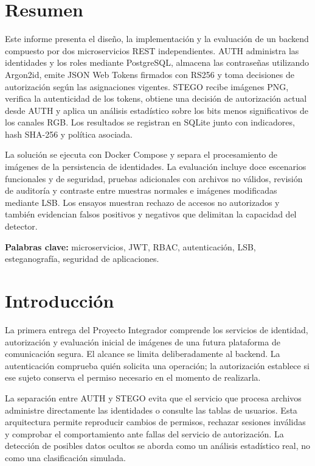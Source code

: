 \documentclass[11pt,a4paper,oneside]{article}
\begin{document}
\section*{Resumen}
Este informe presenta el diseño, la implementación y la evaluación de un backend compuesto por dos microservicios REST independientes. AUTH administra las identidades y los roles mediante PostgreSQL, almacena las contraseñas utilizando Argon2id, emite JSON Web Tokens firmados con RS256 y toma decisiones de autorización según las asignaciones vigentes. STEGO recibe imágenes PNG, verifica la autenticidad de los tokens, obtiene una decisión de autorización actual desde AUTH y aplica un análisis estadístico sobre los bits menos significativos de los canales RGB. Los resultados se registran en SQLite junto con indicadores, hash SHA-256 y política asociada.

La solución se ejecuta con Docker Compose y separa el procesamiento de imágenes de la persistencia de identidades. La evaluación incluye doce escenarios funcionales y de seguridad, pruebas adicionales con archivos no válidos, revisión de auditoría y contraste entre muestras normales e imágenes modificadas mediante LSB. Los ensayos muestran rechazo de accesos no autorizados y también evidencian falsos positivos y negativos que delimitan la capacidad del detector.

\textbf{Palabras clave:} microservicios, JWT, RBAC, autenticación, LSB, esteganografía, seguridad de aplicaciones.
\newpage
\tableofcontents
\newpage
{}

\section{Introducción}
La primera entrega del Proyecto Integrador comprende los servicios de identidad, autorización y evaluación inicial de imágenes de una futura plataforma de comunicación segura. El alcance se limita deliberadamente al backend. La autenticación comprueba quién solicita una operación; la autorización establece si ese sujeto conserva el permiso necesario en el momento de realizarla.

La separación entre AUTH y STEGO evita que el servicio que procesa archivos administre directamente las identidades o consulte las tablas de usuarios. Esta arquitectura permite reproducir cambios de permisos, rechazar sesiones inválidas y comprobar el comportamiento ante fallas del servicio de autorización. La detección de posibles datos ocultos se aborda como un análisis estadístico real, no como una clasificación simulada.
\end{document}
